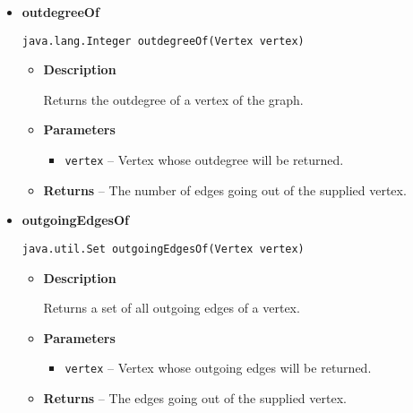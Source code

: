 {{{{{\begin{itemize}
{\begin{itemize}
{Returns the indegree of a vertex of the graph.
}
\item{
{\bf  Parameters}
  \begin{itemize}
   \item{
\texttt{vertex} -- Vertex whose indegree will be returned.}
  \end{itemize}
}%
\item{{\bf  Returns} -- 
The number of edges going into the supplied vertex. 
}%
\end{itemize}
}%
\item{ 
{\bf  outdegreeOf}\\
\begin{lstlisting}[frame=none]
java.lang.Integer outdegreeOf(Vertex vertex)\end{lstlisting} %
\begin{itemize}
\item{
{\bf  Description}

Returns the outdegree of a vertex of the graph.
}
\item{
{\bf  Parameters}
  \begin{itemize}
   \item{
\texttt{vertex} -- Vertex whose outdegree will be returned.}
  \end{itemize}
}%
\item{{\bf  Returns} -- 
The number of edges going out of the supplied vertex. 
}%
\end{itemize}
}%
\item{ 
{\bf  outgoingEdgesOf}\\
\begin{lstlisting}[frame=none]
java.util.Set outgoingEdgesOf(Vertex vertex)\end{lstlisting} %
\begin{itemize}
\item{
{\bf  Description}

Returns a set of all outgoing edges of a vertex.
}
\item{
{\bf  Parameters}
  \begin{itemize}
   \item{
\texttt{vertex} -- Vertex whose outgoing edges will be returned.}
  \end{itemize}
}%
\item{{\bf  Returns} -- 
The edges going out of the supplied vertex. 
}%
\end{itemize}
}%
\end{itemize}
}
}
}}}
